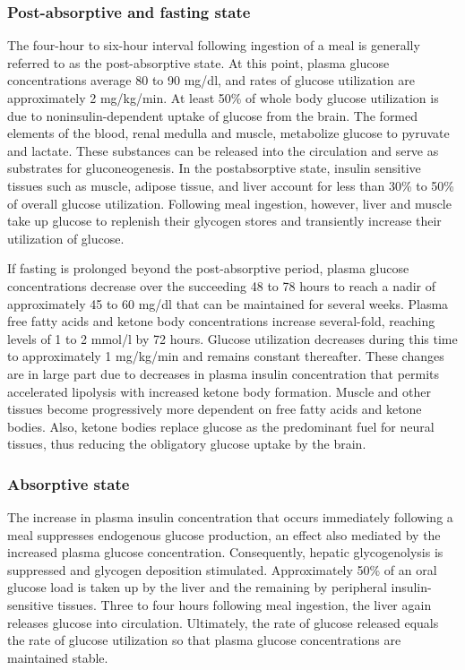 \subsubsection{Post-absorptive and fasting state}
\label{sec:PostAbsorptiveAndFastingState}

The four-hour to six-hour interval following ingestion of a meal is generally referred to as the post-absorptive state. At this point, plasma glucose concentrations average 80 to 90 mg/dl, and rates of glucose utilization are approximately 2 mg/kg/min. At least 50\% of whole body glucose utilization is due to noninsulin-dependent uptake of glucose from the brain. The formed elements of the blood, renal medulla and muscle, metabolize glucose to pyruvate and lactate.  These substances can be released into the circulation and serve as substrates for gluconeogenesis. In the postabsorptive state, insulin sensitive tissues such as muscle, adipose tissue, and liver account for less than 30\% to 50\% of overall glucose utilization. Following meal ingestion, however, liver and muscle take up glucose to replenish their glycogen stores and transiently increase their utilization of glucose.

If fasting is prolonged beyond the post-absorptive period, plasma glucose concentrations decrease over the succeeding 48 to 78 hours to reach a nadir of approximately 45 to 60 mg/dl that can be maintained for several weeks. Plasma free fatty acids and ketone body concentrations increase several-fold, reaching levels of 1 to 2 mmol/l by 72 hours. Glucose utilization decreases during this time to approximately 1 mg/kg/min and remains constant thereafter. These changes are in large part due to decreases in plasma insulin concentration that permits accelerated lipolysis with increased ketone body formation. Muscle and other tissues become progressively more dependent on free fatty acids and ketone bodies. Also, ketone bodies replace glucose as the predominant fuel for neural tissues, thus reducing the obligatory glucose uptake by the brain.

\subsubsection{Absorptive state}
\label{sec:AbsorptiveState}

The increase in plasma insulin concentration that occurs immediately following a meal suppresses endogenous glucose production, an effect also mediated by the increased plasma glucose concentration. Consequently, hepatic glycogenolysis is suppressed and glycogen deposition stimulated. Approximately 50\% of an oral glucose load is taken up by the liver and the remaining by peripheral insulin-sensitive tissues. Three to four hours following meal ingestion, the liver again releases glucose into circulation. Ultimately, the rate of glucose released equals the rate of glucose utilization so that plasma glucose concentrations are maintained stable.

